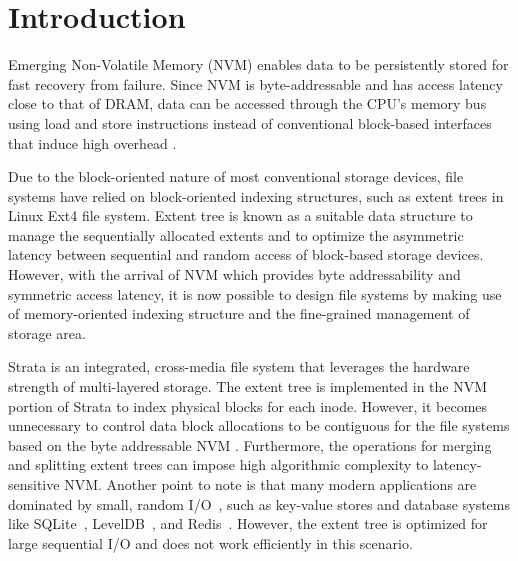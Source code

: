 \documentclass[letterpaper,twocolumn, 11pt]{article}
\begin{document}
\section{Introduction}
Emerging Non-Volatile Memory (NVM) enables data to be persistently
stored for fast recovery from failure. Since NVM is byte-addressable and has access latency close to that of DRAM, data can be accessed through the CPU's memory bus using load and store instructions instead of conventional block-based interfaces that induce high overhead \cite{BPFS,NV-Heap,PMFS, NV-Tree,WORT}.

Due to the block-oriented nature of most conventional storage devices, file systems have relied on block-oriented indexing structures, such as extent trees in Linux Ext4 file system. Extent tree is known as a suitable data structure to manage the sequentially allocated extents and to optimize the asymmetric latency between sequential and random access of block-based storage devices. However, with the arrival of NVM which provides byte addressability and symmetric access latency, it is now possible to design file systems by making use of memory-oriented indexing structure and the fine-grained management of storage area.


Strata is an integrated, cross-media file system that leverages the hardware strength of multi-layered storage. The extent tree is implemented in the NVM portion of Strata to index physical blocks for each inode. However, it becomes unnecessary to control data block allocations to be contiguous for the file systems based on the byte addressable NVM %
. Furthermore, the operations for merging and splitting extent trees can impose high algorithmic complexity to latency-sensitive NVM. Another point to note is that many modern applications are dominated by small, random I/O~\cite{atikoglu2012workload}, such as key-value stores and database systems like SQLite~\cite{sqlite}, LevelDB~\cite{leveldb}, and Redis~\cite{redis}. However, the extent tree is optimized for large sequential I/O and does not work efficiently in this scenario.
\end{document}
